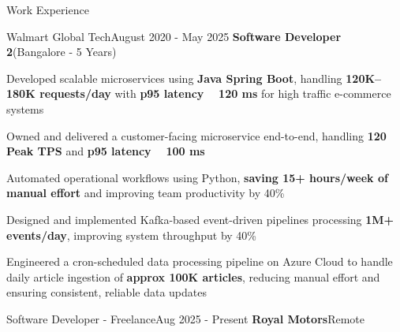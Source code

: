 \begin{cvsection}{Work Experience}
\vspace{\smallverticalskip}

\begin{rSubsection}{\fontsize{12pt}{14pt} \selectfont Walmart Global Tech}{August 2020 - May 2025}{\bf \fontsize{11pt}{14pt} \selectfont Software Developer 2}{(Bangalore - 5 Years)}

\item Developed scalable microservices using {\bf Java Spring Boot}, handling {\bf 120K–180K requests/day} with {\bf p95 latency ~ 120 ms} for high traffic e-commerce systems

\item Owned and delivered a customer-facing microservice end-to-end, handling {\bf 120 Peak TPS} and {\bf p95 latency ~ 100 ms}  

\item Automated operational workflows using Python, {\bf saving 15+ hours/week of manual effort} and improving team productivity by 40\%

\item Designed and implemented Kafka-based event-driven pipelines processing {\bf 1M+ events/day}, improving system throughput by 40\%


\item Engineered a cron-scheduled data processing pipeline on Azure Cloud to handle daily article ingestion of \textbf{approx 100K articles}, reducing manual effort and ensuring consistent, reliable data updates

\end{rSubsection}

\begin{rSubsection}{\fontsize{12pt}{14pt} \selectfont Software Developer - Freelance}{Aug 2025 - Present}{\bf \fontsize{11pt}{14pt} \selectfont Royal Motors}{Remote}


\end{rSubsection}
\end{cvsection}
